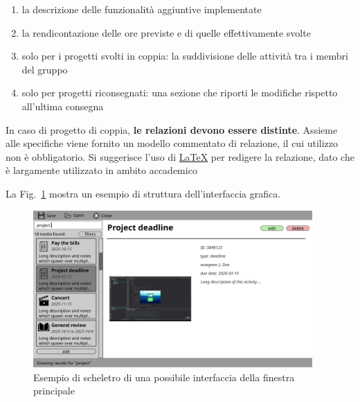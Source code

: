 \documentclass[10pt,a4paper,oneside]{article}
\begin{document}
\begin{enumerate}
\begin{enumerate}
  \item la descrizione delle funzionalità aggiuntive implementate
  \item la rendicontazione delle ore previste e di quelle effettivamente svolte
  \item solo per i progetti svolti in coppia: la suddivisione delle attività tra i membri del gruppo
  \item solo per progetti riconsegnati: una sezione che riporti le modifiche rispetto all'ultima consegna
 \end{enumerate}
 In caso di progetto di coppia, \textbf{le relazioni devono essere distinte}. Assieme alle specifiche viene fornito un modello commentato di relazione, il cui utilizzo non è obbligatorio. Si suggerisce l'uso di \href{https://it.wikipedia.org/wiki/LaTeX}{LaTeX} per redigere la relazione, dato che è largamente utilizzato in ambito accademico
\end{enumerate}

La Fig.~\ref{fig:skeleton} mostra un esempio di struttura dell'interfaccia grafica.

\begin{figure}[t]
	\includegraphics[width=0.95\textwidth]{assets/gui-skeleton-sample}
	\caption{Esempio di scheletro di una possibile interfaccia della finestra principale}\label{fig:skeleton}
\end{figure}

\end{document}

